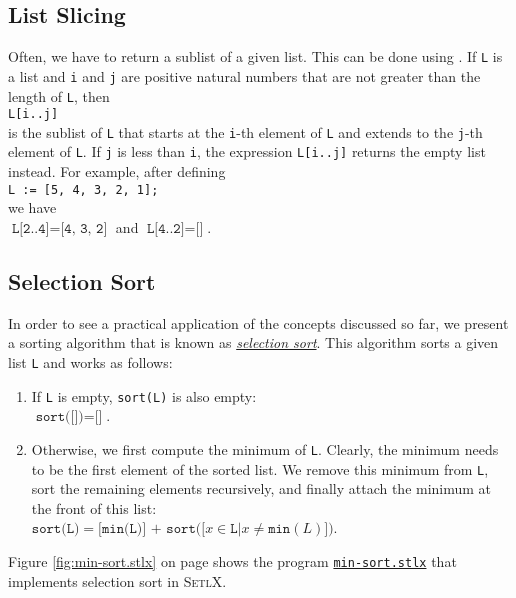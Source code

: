 \subsection{List Slicing}
Often, we have to return a sublist of a given list.  This can be done using .  If
\texttt{L} is a list and \texttt{i} and \texttt{j} are positive natural numbers that are not greater
than the length of \texttt{L}, then
\\[0.2cm]
\hspace*{1.3cm}
\texttt{L[i..j]}
\\[0.2cm]
is the sublist of \texttt{L} that starts at the \texttt{i}-th element of \texttt{L} and extends to
the \texttt{j}-th element of \texttt{L}.  If \texttt{j} is less than \texttt{i}, the expression
\texttt{L[i..j]} returns the empty list instead.  For example, after defining
\\[0.2cm]
\hspace*{1.3cm}
\texttt{L := [5, 4, 3, 2, 1];}
\\[0.2cm]
we have 
\\[0.2cm]
\hspace*{1.3cm}
$\texttt{L[2..4]} = \texttt{[4, 3, 2]}$ \quad and \quad $\texttt{L[4..2]} = \texttt{[]}$.


\subsection{Selection Sort}
In order to see a practical application of the concepts discussed so far, we present a sorting
algorithm that is known as \href{https://en.wikipedia.org/wiki/Selection_sort}{\emph{selection sort}}.
This algorithm sorts a given list \texttt{L} and works as follows:
\begin{enumerate}
\item If \texttt{L} is empty, \texttt{sort(L)} is also empty:
      \\[0.2cm]
      \hspace*{1.3cm}
      $\texttt{sort([])} = \texttt{[]}$.
\item Otherwise, we first compute the minimum of \texttt{L}.  Clearly, the minimum needs to be the
      first element of the sorted list.  We remove this minimum from \texttt{L}, sort the remaining
      elements recursively, and finally attach the minimum at the front of this list:
      \\[0.2cm]
      \hspace*{1.3cm}
      $\texttt{sort(L)} = \texttt{[min(L)] + sort([}x \in \texttt{L} \texttt{|} x \not= \texttt{min}(L)\texttt{])}$.
\end{enumerate}
Figure \ref{fig:min-sort.stlx} on page \pageref{fig:min-sort.stlx} shows the program
\href{https://github.com/karlstroetmann/Logik/blob/master/SetlX/min-sort.stlx}{\texttt{min-sort.stlx}}
that implements selection sort  in \textsc{SetlX}. 

